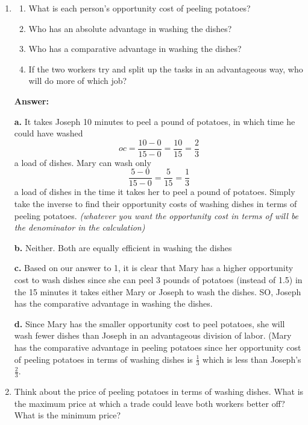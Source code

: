 \documentclass[12pt]{article}
\begin{document}
\begin{enumerate}
\item 
    \begin{enumerate}
        \item What is each person's opportunity cost of peeling potatoes?
        \item Who has an absolute advantage in washing the dishes?
        \item Who has a comparative advantage in washing the dishes?
        \item If the two workers try and split up the tasks in an advantageous way, who will do more of which job?
    \end{enumerate}

    \textbf{Answer:}

\medskip

\textbf{a.} It takes Joseph 10 minutes to peel a pound of potatoes, in which time he could have washed \[oc = \frac{10-0}{15-0} = \frac{10}{15} = \frac{2}{3}\] a load of dishes. Mary can wash only \[\frac{5-0}{15-0} = \frac{5}{15} =\frac{1}{3}\] a load of dishes in the time it takes her to peel a pound of potatoes. Simply take the inverse to find their opportunity costs of washing dishes in terms of peeling potatoes.\textit{ (whatever you want the opportunity cost in terms of will be the denominator in the calculation)}

\medskip

\textbf{b.} Neither. Both are equally efficient in washing the dishes

\medskip

\textbf{c.} Based on our answer to 1, it is clear that Mary has a higher opportunity cost to wash dishes since she can peel 3 pounds of potatoes (instead of 1.5) in the 15 minutes it takes either Mary or Joseph to wash the dishes. SO, Joseph has the comparative advantage in washing the dishes.

\medskip

\textbf{d.} Since Mary has the smaller opportunity cost to peel potatoes, she will wash fewer dishes than Joseph in an advantageous division of labor. (Mary has the comparative advantage in peeling potatoes since her opportunity cost of peeling potatoes in terms of washing dishes is $\frac{1}{3}$ which is less than Joseph's $\frac{2}{3}$.



\item Think about the price of peeling potatoes in terms of washing dishes. What is the maximum price at which a trade could leave both workers better off? What is the minimum price?


\end{enumerate}
\end{document}
